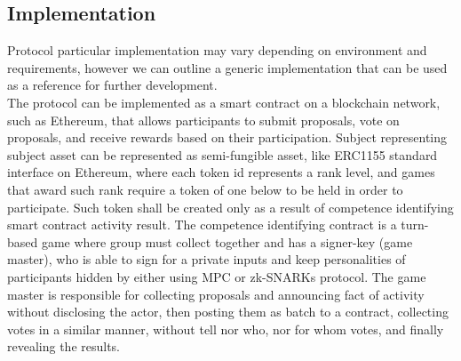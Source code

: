 \documentclass{article}
\begin{document}
\begin{CJK}{UTF8}{gbsn}
\begin{multicols}{2}
        \section{Implementation}
        Protocol particular implementation may vary depending on environment and requirements, however we can outline a generic implementation that can be used as a reference for further development.\\
        The protocol can be implemented as a smart contract on a blockchain network, such as Ethereum, that allows participants to submit proposals, vote on proposals, and receive rewards based on their participation. Subject representing subject asset can be represented as semi-fungible asset, like ERC1155\cite{EIP1155} standard interface on Ethereum, where each token id represents a rank level, and games that award such rank require a token of one below to be held in order to participate. Such token shall be created only as a result of competence identifying smart contract activity result. The competence identifying contract is a turn-based game where group must collect together and has a signer-key (game master), who is able to sign for a private inputs and keep personalities of participants hidden by either using MPC or zk-SNARKs protocol.
        The game master is responsible for collecting proposals and announcing fact of activity without disclosing the actor, then posting them as batch to a contract, collecting votes in a similar manner, without tell nor who, nor for whom votes, and finally revealing the results.\\




\end{multicols}
\end{CJK}
\end{document}
